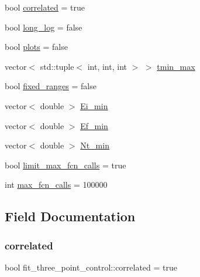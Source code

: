 \begin{DoxyCompactItemize}
\item 
bool \mbox{\hyperlink{structfit__three__point__control_aba36b4d034a912a3d14e035a32a6c8dd}{correlated}} = true
\item 
bool \mbox{\hyperlink{structfit__three__point__control_a970397a4380ab60b66c3b4da10c0b357}{long\+\_\+log}} = false
\item 
bool \mbox{\hyperlink{structfit__three__point__control_a102c86949fe798fcf5402f9a2806017c}{plots}} = false
\item 
vector$<$ std\+::tuple$<$ int, int, int $>$ $>$ \mbox{\hyperlink{structfit__three__point__control_aefe82be4ea2d4b948b7b8c9fdc6cdec8}{tmin\+\_\+max}}
\item 
bool \mbox{\hyperlink{structfit__three__point__control_a1ea653156c59540d60f4b179b898904a}{fixed\+\_\+ranges}} = false
\item 
vector$<$ double $>$ \mbox{\hyperlink{structfit__three__point__control_aa0d48a496d77a954c34fa802e0e02536}{Ei\+\_\+min}}
\item 
vector$<$ double $>$ \mbox{\hyperlink{structfit__three__point__control_a13eb5013a0ba98431a8e0036026d248f}{Ef\+\_\+min}}
\item 
vector$<$ double $>$ \mbox{\hyperlink{structfit__three__point__control_a5f97d907c2fac958abc8172d45874bce}{Nt\+\_\+min}}
\item 
bool \mbox{\hyperlink{structfit__three__point__control_ab4ee8f7fba4d71583733b73088a08270}{limit\+\_\+max\+\_\+fcn\+\_\+calls}} = true
\item 
int \mbox{\hyperlink{structfit__three__point__control_a0fc5977303b58da6135baf90176c0305}{max\+\_\+fcn\+\_\+calls}} = 100000
\end{DoxyCompactItemize}


\subsection{Field Documentation}
\mbox{\label{structfit__three__point__control_aba36b4d034a912a3d14e035a32a6c8dd}} 
\subsubsection{\texorpdfstring{correlated}{correlated}}
{\footnotesize\ttfamily bool fit\+\_\+three\+\_\+point\+\_\+control\+::correlated = true}

